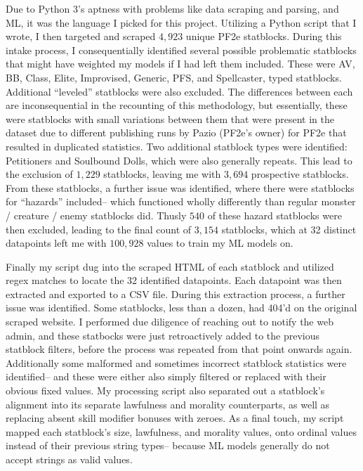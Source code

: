 \documentclass[11pt]{article}
\begin{document}
Due to Python 3's aptness with problems like data scraping and parsing, and ML, it was the language I picked for this project. Utilizing a Python script that I wrote, I then targeted and scraped $4,923$ unique PF2e statblocks. During this intake process, I consequentially identified several possible problematic statblocks that might have weighted my models if I had left them included. These were AV, BB, Class, Elite, Improvised, Generic, PFS, and Spellcaster, typed statblocks. Additional ``leveled'' statblocks were also excluded. The differences between each are inconsequential in the recounting of this methodology, but essentially, these were statblocks with small variations between them that were present in the dataset due to different publishing runs by Pazio (PF2e's owner) for PF2e that resulted in duplicated statistics. Two additional statblock types were identified: Petitioners and Soulbound Dolls, which were also generally repeats. This lead to the exclusion of $1,229$ statblocks, leaving me with $3,694$ prospective statblocks. From these statblocks, a further issue was identified, where there were statblocks for ``hazards'' included-- which functioned wholly differently than regular monster / creature / enemy statblocks did. Thusly $540$ of these hazard statblocks were then excluded, leading to the final count of $3,154$ statblocks, which at 32 distinct datapoints left me with $100,928$ values to train my ML models on.

Finally my script dug into the scraped HTML of each statblock and utilized regex matches to locate the 32 identified datapoints. Each datapoint was then extracted and exported to a CSV file. During this extraction process, a further issue was identified. Some statblocks, less than a dozen, had 404'd on the original scraped website. I performed due diligence of reaching out to notify the web admin, and these statbocks were just retroactively added to the previous statblock filters, before the process was repeated from that point onwards again. Additionally some malformed and sometimes incorrect statblock statistics were identified-- and these were either also simply filtered or replaced with their obvious fixed values. My processing script also separated out a statblock's alignment into its separate lawfulness and morality counterparts, as well as replacing absent skill modifier bonuses with zeroes. As a final touch, my script mapped each statblock's size, lawfulness, and morality values, onto ordinal values instead of their previous string types-- because ML models generally do not accept strings as valid values.
\end{document}
